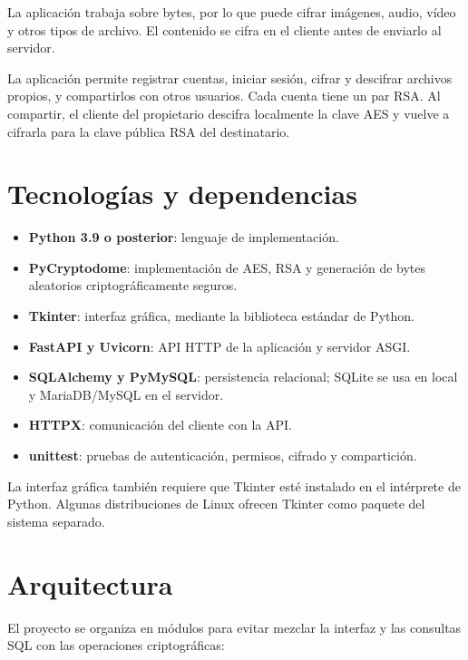\documentclass[12pt,a4paper]{article}
\begin{document}
La aplicación trabaja sobre bytes, por lo que puede cifrar imágenes, audio, vídeo y otros tipos de archivo. El contenido se cifra en el cliente antes de enviarlo al servidor.

La aplicación permite registrar cuentas, iniciar sesión, cifrar y descifrar archivos propios, y compartirlos con otros usuarios. Cada cuenta tiene un par RSA. Al compartir, el cliente del propietario descifra localmente la clave AES y vuelve a cifrarla para la clave pública RSA del destinatario.

\section{Tecnologías y dependencias}

\begin{itemize}
    \item \textbf{Python 3.9 o posterior}: lenguaje de implementación.
    \item \textbf{PyCryptodome}: implementación de AES, RSA y generación de bytes aleatorios criptográficamente seguros.
    \item \textbf{Tkinter}: interfaz gráfica, mediante la biblioteca estándar de Python.
    \item \textbf{FastAPI y Uvicorn}: API HTTP de la aplicación y servidor ASGI.
    \item \textbf{SQLAlchemy y PyMySQL}: persistencia relacional; SQLite se usa en local y MariaDB/MySQL en el servidor.
    \item \textbf{HTTPX}: comunicación del cliente con la API.
    \item \textbf{unittest}: pruebas de autenticación, permisos, cifrado y compartición.
\end{itemize}

La interfaz gráfica también requiere que Tkinter esté instalado en el intérprete de Python. Algunas distribuciones de Linux ofrecen Tkinter como paquete del sistema separado.

\section{Arquitectura}

El proyecto se organiza en módulos para evitar mezclar la interfaz y las consultas SQL con las operaciones criptográficas:
\end{document}
